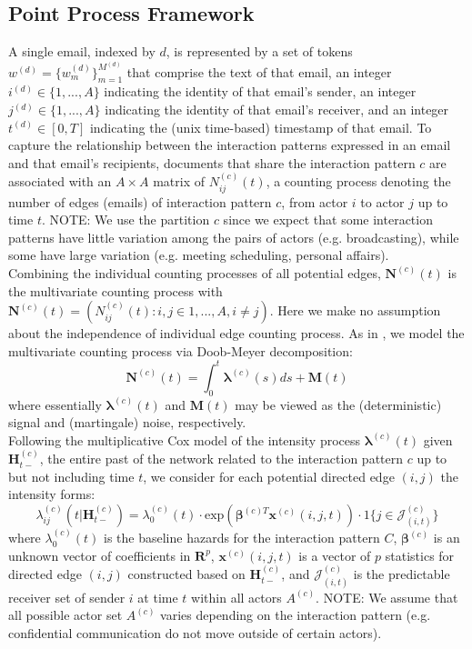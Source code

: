 \documentclass[a4paper]{article}
\begin{document}
\subsection{Point Process Framework}
A single email, indexed by $d$, is represented by a set of tokens $w^{(d)} = \{w^{(d)}_m \}_{m=1}^{M^{(d)}}$ that comprise the
text of that email, an integer $i^{(d)} \in \{1,...,A\}$ indicating the identity of that email’s sender, an integer $j^{(d)} \in \{1,...,A\}$ indicating the identity of that email’s receiver, and an integer $t^{(d)} \in [0, T]$ indicating the (unix time-based) timestamp of that email. To capture the relationship between the interaction patterns expressed in an email and that email’s recipients, documents that share the interaction pattern $c$ are associated with an $A\times A$ matrix of $N^{(c)}_{ij}(t)$, a counting process denoting the number of edges (emails) of interaction pattern $c$, from actor $i$ to actor $j$ up to time $t$. NOTE: We use the partition $c$ since we expect that some interaction patterns have little variation among the pairs of actors (e.g. broadcasting), while some have large variation (e.g. meeting scheduling, personal affairs). \\ \newline Combining the individual counting processes of all potential edges,  $\mathbf{N}^{(c)}(t)$ is the multivariate counting process with $\mathbf{N}^{(c)}(t)=(N^{(c)}_{ij}(t): i, j \in {1, ..., A}, i \neq j)$. Here we make no assumption about the independence of individual edge counting process. As in \cite{Vu2011}, we model the multivariate counting process via Doob-Meyer decomposition:
\begin{equation}
\mathbf{N}^{(c)}(t)=\int_0^t\boldsymbol{\lambda}^{(c)}(s)ds + \mathbf{M}(t)
\end{equation}
where essentially $\boldsymbol{\lambda}^{(c)}(t)$ and $\mathbf{M}(t)$ may be viewed as the (deterministic) signal and (martingale) noise, respectively.\\ \newline
Following the multiplicative Cox model of the intensity process $\boldsymbol{\lambda}^{(c)}(t)$ given $\boldsymbol{H}^{(c)}_{t-}$, the entire past of the network related to the interaction pattern $c$ up to but not including time $t$, we consider for each potential directed edge $(i, j)$ the intensity forms:
\begin{equation}
\lambda^{(c)}_{ij}(t|\boldsymbol{H}^{(c)}_{t-})=\lambda^{(c)}_0(t)\cdot \mbox{exp}(\boldsymbol{\beta}^{(c)T}\boldsymbol{x}^{(c)}(i, j, t))\cdot 1\{j \in \mathcal{J}^{(c)}_{(i, t)}\}
\end{equation}
where $\lambda_0^{(c)}(t)$ is the baseline hazards for the interaction pattern $C$, $\boldsymbol{\beta}^{(c)}$ is an unknown vector of coefficients in $\boldsymbol{R}^{p}$, $\boldsymbol{x}^{(c)}(i, j, t)$ is a vector of $p$ statistics for directed edge $(i, j)$ constructed based on
$\boldsymbol{H}^{(c)}_{t-}$, and $\mathcal{J}^{(c)}_{(i, t)}$ is the predictable receiver set of sender $i$ at time $t$ within all actors $A^{(c)}$. NOTE: We assume that all possible actor set $A^{(c)}$ varies depending on the interaction pattern (e.g. confidential communication do not move outside of certain actors).
\end{document}
